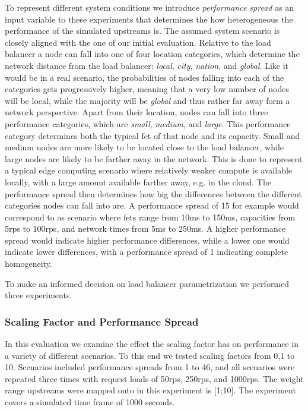 To represent different system conditions we introduce \textit{performance spread} as an input variable to these experiments that determines the how heterogeneous the performance of the simulated upstreams is.
The assumed system scenario is closely aligned with the one of our initial evaluation.
Relative to the load balancer a node can fall into one of four location categories, which determine the network distance from the load balancer: \textit{local}, \textit{city}, \textit{nation}, and \textit{global}.
Like it would  be in a real scenario, the probabilities of nodes falling into each of the categories gets progressively higher, meaning that a very low number of nodes will be local, while the majority will be \textit{global} and thus rather far away form a network perspective.
Apart from their location, nodes can fall into three performance categories, which are \textit{small}, \textit{medium}, and \textit{large}.
This performance category determines both the typical \gls{fet} of that node and its capacity.
Small and medium nodes are more likely to be located close to the load balancer, while large nodes are likely to be farther away in the network.
This is done to represent a typical edge computing scenario where relatively weaker compute is available locally, with a large amount available farther away, e.g. in the cloud.
The performance spread then determines how big the differences between the different categories nodes can fall into are.
A performance spread of 15 for example would correspond to as scenario where \glspl{fet} range from 10ms to 150ms, capacities from 5\gls{rps} to 100\gls{rps}, and network times from 5ms to 250ms.
A higher performance spread would indicate higher performance differences, while a lower one would indicate lower differences, with a performance spread of 1 indicating complete homogeneity.


To make an informed decision on load balancer parametrization we performed three experiments.
\subsubsection{Scaling Factor and Performance Spread}
In this evaluation we examine the effect the scaling factor has on performance in a variety of different scenarios.
To this end we tested scaling factors from 0,1 to 10.
Scenarios included performance spreads from 1 to 46, and all scenarios were repeated three times with request loads of 50\gls{rps}, 250\gls{rps}, and 1000\gls{rps}.
The weight range upstreams were mapped onto in this experiment is [1;10].
The experiment covers a simulated time frame of 1000 seconds.

